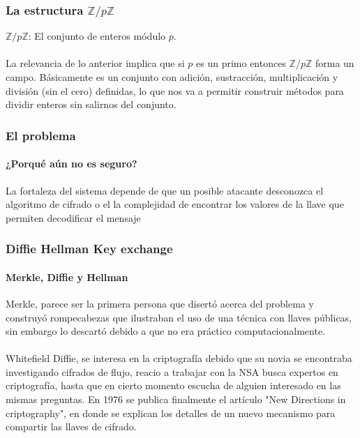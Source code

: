 \documentclass[spanish, mexico]{beamer}
\begin{document}
	\begin{frame}
		\frametitle{La estructura $\mathbb{Z}/p\mathbb{Z}$}
		$\mathbb{Z}/p\mathbb{Z}$: El conjunto de enteros módulo $p$.\\~\\
		 La relevancia de lo anterior implica que si $p$ es un primo entonces $\mathbb{Z}/p\mathbb{Z}$ forma un campo. Básicamente es un conjunto con adición, sustracción, multiplicación  y división (sin el cero) definidas, lo que nos va a permitir construir métodos para dividir enteros sin salirnos del conjunto.
	\end{frame}

	\begin{frame}
		\frametitle{El problema}
		\framesubtitle{¿Porqué aún no es seguro?}
		La fortaleza del sistema depende de que un posible atacante desconozca el algoritmo de cifrado o el la complejidad de encontrar los valores de la llave que permiten decodificar el mensaje
	\end{frame}

	\begin{frame}
		\frametitle{Diffie Hellman Key exchange}
		\framesubtitle{Merkle, Diffie y Hellman}
		Merkle, parece ser la primera persona que disertó acerca del problema y construyó rompecabezas que ilustraban el uso de una técnica con llaves públicas, sin embargo lo descartó debido a que no era práctico computacionalmente.\\~\\
		Whitefield Diffie, se interesa en la criptografía debido que su novia se encontraba investigando cifrados de flujo, reacio a trabajar con la NSA busca expertos en criptografía, hasta que en cierto momento escucha de alguien interesado en las mismas preguntas. En 1976 se publica finalmente el artículo "New Directions in criptography", en donde se explican los detalles de un nuevo mecanismo para compartir las llaves de cifrado.
	\end{frame}
\end{document}
